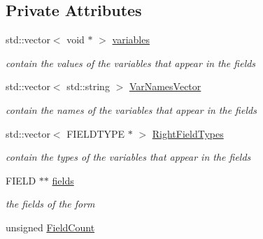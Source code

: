 \subsection*{Private Attributes}
\begin{DoxyCompactItemize}
\item 
\hypertarget{class_c_form_ac2f5c5169ad400f4f5a32c65aecdd14f}{std\-::vector$<$ void $\ast$ $>$ \hyperlink{class_c_form_ac2f5c5169ad400f4f5a32c65aecdd14f}{variables}}\label{class_c_form_ac2f5c5169ad400f4f5a32c65aecdd14f}

\begin{DoxyCompactList}\small\item\em contain the values of the variables that appear in the fields \end{DoxyCompactList}\item 
\hypertarget{class_c_form_a075f201739b27a33099ac1a3fe415d87}{std\-::vector$<$ std\-::string $>$ \hyperlink{class_c_form_a075f201739b27a33099ac1a3fe415d87}{Var\-Names\-Vector}}\label{class_c_form_a075f201739b27a33099ac1a3fe415d87}

\begin{DoxyCompactList}\small\item\em contain the names of the variables that appear in the fields \end{DoxyCompactList}\item 
\hypertarget{class_c_form_a265a3dc8e13610c920f41f8ac755da0f}{std\-::vector$<$ F\-I\-E\-L\-D\-T\-Y\-P\-E $\ast$ $>$ \hyperlink{class_c_form_a265a3dc8e13610c920f41f8ac755da0f}{Right\-Field\-Types}}\label{class_c_form_a265a3dc8e13610c920f41f8ac755da0f}

\begin{DoxyCompactList}\small\item\em contain the types of the variables that appear in the fields \end{DoxyCompactList}\item 
\hypertarget{class_c_form_a9d0228604b58ba8ee4d1c2eea87bc2fe}{F\-I\-E\-L\-D $\ast$$\ast$ \hyperlink{class_c_form_a9d0228604b58ba8ee4d1c2eea87bc2fe}{fields}}\label{class_c_form_a9d0228604b58ba8ee4d1c2eea87bc2fe}

\begin{DoxyCompactList}\small\item\em the fields of the form \end{DoxyCompactList}\item 
\hypertarget{class_c_form_a66298e20d5b612661c822deef78290ad}{unsigned \hyperlink{class_c_form_a66298e20d5b612661c822deef78290ad}{Field\-Count}}\label{class_c_form_a66298e20d5b612661c822deef78290ad}


\end{DoxyCompactItemize}
